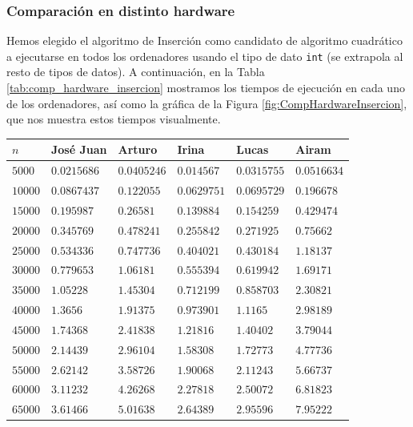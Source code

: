 \documentclass[12pt]{article}
\begin{document}
    \subsubsection{Comparación en distinto hardware}
    Hemos elegido el algoritmo de Inserción como candidato de algoritmo cuadrático a ejecutarse en todos los ordenadores usando el tipo de dato \verb|int| (se extrapola al resto de tipos de datos). A continuación, en la Tabla \ref{tab:comp_hardware_insercion} mostramos los tiempos de ejecución en cada uno de los ordenadores, así como la gráfica de la Figura \ref{fig:CompHardwareInsercion}, que nos muestra estos tiempos visualmente.
    \begin{table}
        \centering
        \begin{tabular}{|l|l|l|l|l|l|}
            \hline
            $n$ & José Juan & Arturo & Irina & Lucas & Airam \\
            \hline
            $5000$ & $0.0215686$ & $0.0405246$ & $0.014567$ & $0.0315755$ & $0.0516634$ \\
            $10000$ & $0.0867437$ & $0.122055$ & $0.0629751$ & $0.0695729$ & $0.196678$ \\
            $15000$ & $0.195987$ & $0.26581$ & $0.139884$ & $0.154259$ & $0.429474$ \\
            $20000$ & $0.345769$ & $0.478241$ & $0.255842$ & $0.271925$ & $0.75662$ \\
            $25000$ & $0.534336$ & $0.747736$ & $0.404021$ & $0.430184$ & $1.18137$ \\
            $30000$ & $0.779653$ & $1.06181$ & $0.555394$ & $0.619942$ & $1.69171$ \\
            $35000$ & $1.05228$ & $1.45304$ & $0.712199$ & $0.858703$ & $2.30821$ \\
            $40000$ & $1.3656$ & $1.91375$ & \underline{$0.973901$} & $1.1165$ & \underline{$2.98189$} \\
            $45000$ & $1.74368$ & $2.41838$ & $1.21816$ & $1.40402$ & $3.79044$ \\
            $50000$ & $2.14439$ & $2.96104$ & $1.58308$ & $1.72773$ & $4.77736$ \\
            $55000$ & $2.62142$ & $3.58726$ & $1.90068$ & $2.11243$ & $5.66737$ \\
            $60000$ & $3.11232$ & $4.26268$ & $2.27818$ & $2.50072$ & $6.81823$ \\
            $65000$ & $3.61466$ & $5.01638$ & $2.64389$ & $2.95596$ & $7.95222$ \\

\end{tabular}
\end{table}
\end{document}
